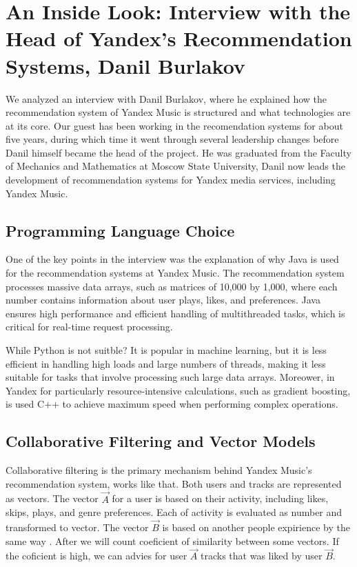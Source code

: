 \documentclass[12pt,a4paper]{article}
\begin{document}
\section{An Inside Look: Interview with the Head of Yandex's Recommendation Systems, Danil Burlakov}

    We analyzed an interview with Danil Burlakov, where he explained how the recommendation system of Yandex Music is structured and what technologies are at its core. Our guest has been working in the recomendation systems for about five years, during which time it went through several leadership changes before Danil himself became the head of the project. He was graduated from the Faculty of Mechanics and Mathematics at Moscow State University, Danil now leads the development of recommendation systems for Yandex media services, including Yandex Music\citep{YandexI}.

\subsection{Programming Language Choice}

One of the key points in the interview was the explanation of why Java is used for the recommendation systems at Yandex Music. The recommendation system processes massive data arrays, such as matrices of 10,000 by 1,000, where each number contains information about user plays, likes, and preferences. Java ensures high performance and efficient handling of multithreaded tasks, which is critical for real-time request processing\citep{YT}.

While Python is not suitble? It is popular in machine learning, but it is less efficient in handling high loads and large numbers of threads, making it less suitable for tasks that involve processing such large data arrays. Moreower, in Yandex for particularly resource-intensive calculations, such as gradient boosting, is used C++ to achieve maximum speed when performing complex operations.

\subsection{Collaborative Filtering and Vector Models}

Collaborative filtering is the primary mechanism behind Yandex Music’s recommendation system, works like that. Both users and tracks are represented as vectors. The vector $\vec{A}$ for a user is based on their activity, including likes, skips, plays, and genre preferences. Each of activity is evaluated as number and transformed to vector. The vector $\vec{B}$ is based on another people  expirience by the same way \citep{Yandex}. After we will count coeficient of similarity between some vectors. If the coficient is high, we can advies for user $\vec{A}$ tracks that was liked by user $\vec{B}$.
\end{document}
